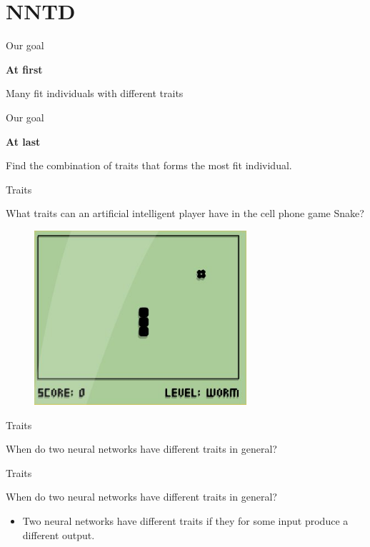 \section{NNTD}
\begin{frame}{Our goal}
\begin{center}
\textbf{At first}

Many fit individuals with different traits
\end{center}
\end{frame}

\begin{frame}{Our goal}
\begin{center}
\textbf{At last}

Find the combination of traits that forms the most fit individual.
\end{center}
\end{frame}

\begin{frame}{Traits}
\begin{center}
  What traits can an artificial intelligent player have in the cell phone game Snake?
  \begin{figure}[p]
  \includegraphics[width=0.7\textwidth]{images/snake.jpg}
  \end{figure}
  \end{center}
\end{frame}

\begin{frame}{Traits}
\begin{center}
  When do two neural networks have different traits in general?
  \end{center}
\end{frame}

\begin{frame}{Traits}
\begin{center}
  When do two neural networks have different traits in general?
  \begin{itemize}
	\item Two neural networks have different traits if they for some input produce a different output.
  \end{itemize}
  \end{center}
\end{frame}

